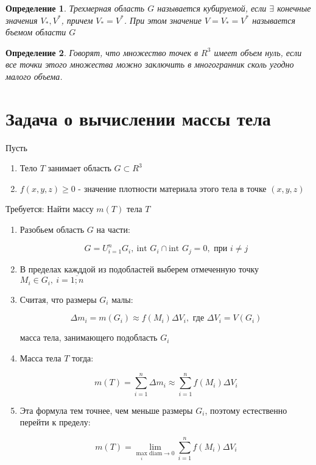 \documentclass[a4paper, 14pt]{report}
\newtheorem{defenition}{Определение}[section]
\begin{document}
\begin{defenition}
    Трехмерная область $G$ называется кубируемой, если $\exists$ конечные значения $V_*, V^*$, причем $V_* = V^*$. При этом значение $V = V_* = V^*$ называется бъемом области $G$
\end{defenition}

\begin{defenition}
    Говорят, что множество точек в $R^3$ имеет объем нуль, если все точки этого множества можно заключить в многогранник сколь угодно малого объема.
\end{defenition}

\section{Задача о вычислении массы тела}

Пусть 

\begin{enumerate}
    \item Тело $T$ занимает область $G \subset R^3$
    \item $f(x,y,z) \geq 0$ - значение плотности материала этого тела в точке $(x,y,z)$
\end{enumerate}

Требуется: Найти массу $m(T)$ тела $T$

\begin{enumerate}
    \item Разобьем область $G$ на части:

        $$
        G = U_{i=1}^{n} G_i,\ \text{int }G_i \cap \text{int } G_j = 0, \text{ при } i \ne j
        $$

    \item В пределах кажддой из подобластей выберем отмеченную точку $M_i \in G_i,\ i = \overline{1;n}$

    \item Считая, что размеры $G_i$ малы:

        $$
        \Delta m_i = m(G_i) \approx f(M_i) \Delta V_i, \text{ где } \Delta V_i = V(G_i)
        $$

        масса тела, занимающего подобласть $G_i$

    \item Масса тела $T$ тогда:

        $$
        m(T) = \sum_{i=1}^n \Delta m_i \approx \sum_{i=1}^n f(M_i) \Delta V_i
        $$

    \item Эта формула тем точнее, чем меньше размеры $G_i$, поэтому естественно перейти к пределу:

        $$
        m(T) = \underset{ \underset{i}{\text{max}}\text{ diam} \to 0 }{\lim} \sum_{i=1}^n f(M_i) \Delta V_i
        $$
\end{enumerate}
\end{document}
